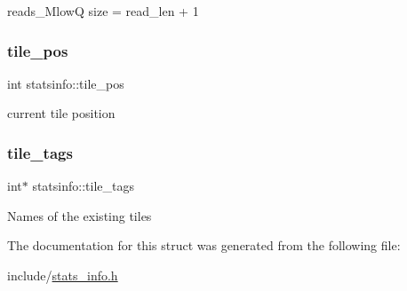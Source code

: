 reads\+\_\+\+MlowQ size = read\+\_\+len + 1 \mbox{\label{structstatsinfo_a740378fa01d92f6e0b2c50a26889fefd}} 
\subsubsection{\texorpdfstring{tile\+\_\+pos}{tile\_pos}}
{\footnotesize\ttfamily int statsinfo\+::tile\+\_\+pos}

current tile position \mbox{\label{structstatsinfo_a25f475c79fa4d5aa1255b8c543d8a731}} 
\subsubsection{\texorpdfstring{tile\+\_\+tags}{tile\_tags}}
{\footnotesize\ttfamily int$\ast$ statsinfo\+::tile\+\_\+tags}

Names of the existing tiles 

The documentation for this struct was generated from the following file\+:\begin{DoxyCompactItemize}
\item 
include/\mbox{\hyperlink{stats__info_8h}{stats\+\_\+info.\+h}}\end{DoxyCompactItemize}
